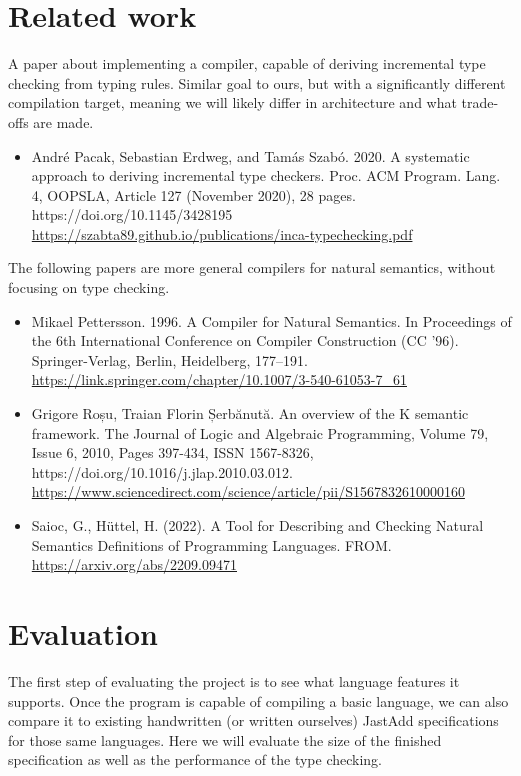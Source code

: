 \documentclass{article}
\begin{document}
\section{Related work}
A paper about implementing a compiler, capable of deriving incremental type checking from typing rules.
Similar goal to ours, but with a significantly different compilation target, meaning we will likely differ in architecture and what trade-offs are made.
\begin{itemize}
  \item
    André Pacak, Sebastian Erdweg, and Tamás Szabó. 2020. A systematic approach to deriving incremental type checkers. Proc. ACM Program. Lang. 4, OOPSLA, Article 127 (November 2020), 28 pages. https://doi.org/10.1145/3428195 \\
    \url{https://szabta89.github.io/publications/inca-typechecking.pdf} \\
\end{itemize}
The following papers are more general compilers for natural semantics, without focusing on type checking.
\begin{itemize}
  \item
    Mikael Pettersson. 1996. A Compiler for Natural Semantics. In Proceedings of the 6th International Conference on Compiler Construction (CC '96). Springer-Verlag, Berlin, Heidelberg, 177–191. \\
    \url{https://link.springer.com/chapter/10.1007/3-540-61053-7\_61} \\

  \item
    Grigore Roșu, Traian Florin Șerbănută. An overview of the K semantic framework.
The Journal of Logic and Algebraic Programming, Volume 79, Issue 6, 2010, Pages 397-434, ISSN 1567-8326, https://doi.org/10.1016/j.jlap.2010.03.012. \\
    \url{https://www.sciencedirect.com/science/article/pii/S1567832610000160} \\

  \item
    Saioc, G., Hüttel, H. (2022). A Tool for Describing and Checking Natural Semantics Definitions of Programming Languages. FROM. \\
    \url{https://arxiv.org/abs/2209.09471}

\end{itemize}


\section{Evaluation}
The first step of evaluating the project is to see what language features it supports. %
Once the program is capable of compiling a basic language, we can also compare it to existing handwritten (or written ourselves) JastAdd specifications for those same languages.
Here we will evaluate the size of the finished specification as well as the performance of the type checking.
\end{document}
